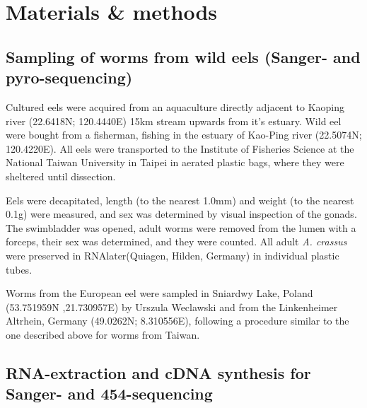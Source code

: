 

\chapter{Materials \& methods} %



\ifpdf
    \graphicspath{{8/figures/PNG/}{8/figures/PDF/}{8/figures/}}
\else
    \graphicspath{{8/figures/EPS/}{8/figures/}}
\fi



\section{Sampling of worms from wild eels (Sanger- and
  pyro-sequencing) }

Cultured eels were acquired from an aquaculture directly adjacent to
Kaoping river (22.6418N; 120.4440E) 15km stream upwards from it's
estuary. Wild eel were bought from a fisherman, fishing in the estuary
of Kao-Ping river (22.5074N; 120.4220E). All eels were transported to
the Institute of Fisheries Science at the National Taiwan University
in Taipei in aerated plastic bags, where they were sheltered until
dissection.

Eels were decapitated, length (to the nearest 1.0mm) and weight (to
the nearest 0.1g) were measured, and sex was determined by visual
inspection of the gonads. The swimbladder was opened, adult worms were
removed from the lumen with a forceps, their sex was determined, and
they were counted. All adult \textit{A. crassus} were preserved in
RNAlater(Quiagen, Hilden, Germany) in individual plastic tubes.

Worms from the European eel were sampled in Sniardwy Lake, Poland
(53.751959N ,21.730957E) by Urszula Weclawski and from the
Linkenheimer Altrhein, Germany (49.0262N; 8.310556E), following a
procedure similar to the one described above for worms from Taiwan.

\section{RNA-extraction and cDNA synthesis for Sanger- and
  454-sequencing}

